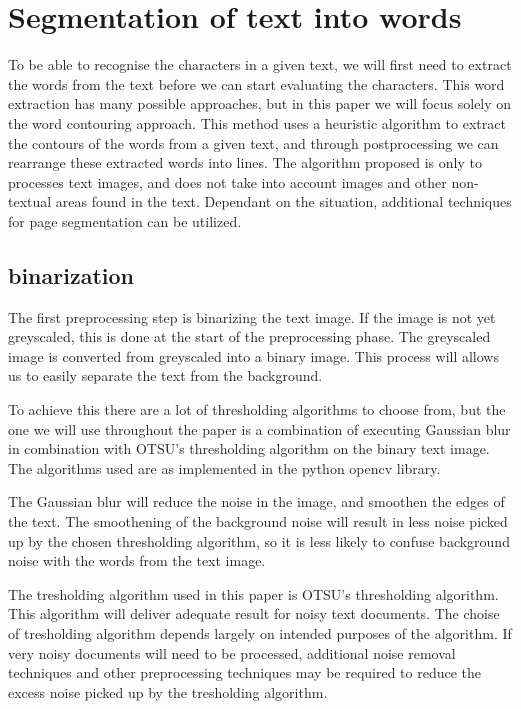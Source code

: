 \documentclass{article}
\begin{document}
\section{Segmentation of text into words}
\label{sec:segtext}

To be able to recognise the characters in a given text, we will first need to extract the words from the text before we can start evaluating the characters. This word extraction has many possible approaches, but in this paper we will focus solely on the word contouring approach.
This method uses a heuristic algorithm to extract the contours of the words from a given text, and through postprocessing we can rearrange these extracted words into lines.
The algorithm proposed is only to processes text images, and does not take into account images and other non-textual areas found in the text.
Dependant on the situation, additional techniques for page segmentation can be utilized. %


\subsection{binarization}
The first preprocessing step is binarizing the text image.
If the image is not yet greyscaled, this is done at the start of the preprocessing phase.
The greyscaled image is converted from greyscaled into a binary image.
This process will allows us to easily separate the text from the background.

To achieve this there are a lot of thresholding algorithms to choose from, but the one we will use throughout the paper is a combination of executing Gaussian blur in combination with OTSU's thresholding algorithm on the binary text image.
The algorithms used are as implemented in the python opencv library. %

The Gaussian blur will reduce the noise in the image, and smoothen the edges of the text.
The smoothening of the background noise will result in less noise picked up by the chosen thresholding algorithm, so it is less likely to confuse background noise with the words from the text image.

The tresholding algorithm used in this paper is OTSU's thresholding algorithm.
This algorithm will deliver adequate result for noisy text documents.
The choise of tresholding algorithm depends largely on intended purposes of the algorithm.
If very noisy documents will need to be processed, additional noise removal techniques and other preprocessing techniques may be required to reduce the excess noise picked up by the tresholding algorithm.
\end{document}
